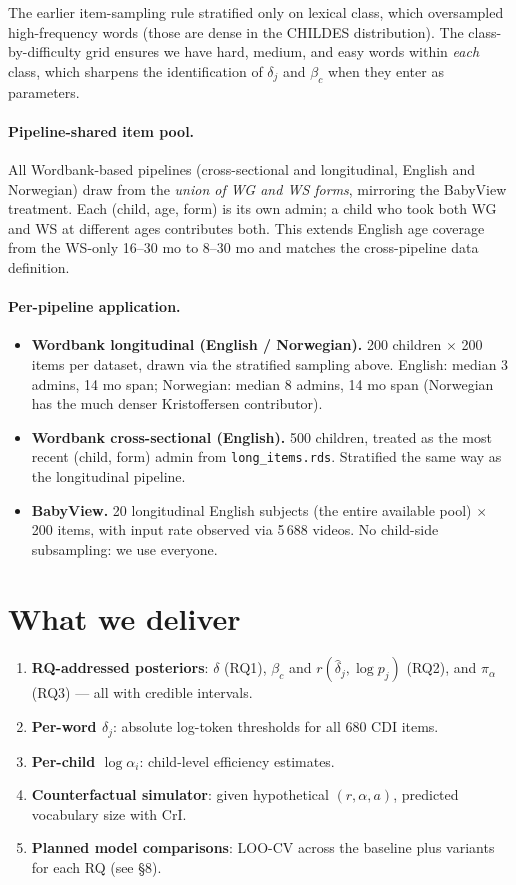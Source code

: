 \documentclass[11pt]{article}
\begin{document}
The earlier item-sampling rule stratified only on lexical class, which
oversampled high-frequency words (those are dense in the CHILDES
distribution). The class-by-difficulty grid ensures we have hard,
medium, and easy words within \emph{each} class, which sharpens the
identification of \(\delta_j\) and \(\beta_c\) when they enter as
parameters.

\paragraph{Pipeline-shared item pool.} All Wordbank-based pipelines
(cross-sectional and longitudinal, English and Norwegian) draw from
the \emph{union of WG and WS forms}, mirroring the BabyView treatment.
Each (child, age, form) is its own admin; a child who took both WG and
WS at different ages contributes both. This extends English age coverage
from the WS-only 16--30 mo to 8--30 mo and matches the cross-pipeline
data definition.

\paragraph{Per-pipeline application.}
\begin{itemize}[leftmargin=1.3em]
\item \textbf{Wordbank longitudinal (English / Norwegian).} 200
children \(\times\) 200 items per dataset, drawn via the stratified
sampling above. English: median 3 admins, 14 mo span; Norwegian:
median 8 admins, 14 mo span (Norwegian has the much denser
Kristoffersen contributor).
\item \textbf{Wordbank cross-sectional (English).} 500 children,
treated as the most recent (child, form) admin from \texttt{long\_items.rds}.
Stratified the same way as the longitudinal pipeline.
\item \textbf{BabyView.} 20 longitudinal English subjects (the entire
available pool) \(\times\) 200 items, with input rate observed via
5\,688 videos. No child-side subsampling: we use everyone.
\end{itemize}

\section{What we deliver}

\begin{enumerate}[leftmargin=1.3em]
\item \textbf{RQ-addressed posteriors}: \(\delta\) (RQ1),
  \(\beta_c\) and \(r(\hat\delta_j, \log p_j)\) (RQ2), and
  \(\pi_\alpha\) (RQ3) — all with credible intervals.
\item \textbf{Per-word \(\delta_j\)}: absolute log-token thresholds for all
  680 CDI items.
\item \textbf{Per-child \(\log \alpha_i\)}: child-level efficiency
  estimates.
\item \textbf{Counterfactual simulator}: given hypothetical
  \((r, \alpha, a)\), predicted vocabulary size with CrI.
\item \textbf{Planned model comparisons}: LOO-CV across the baseline
  plus variants for each RQ (see §8).
\end{enumerate}
\end{document}
